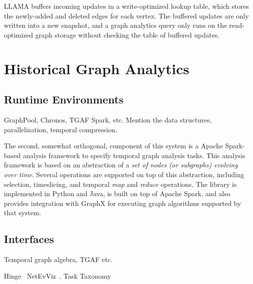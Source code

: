 \documentclass{svjour3}
\begin{document}
LLAMA buffers incoming updates in a write-optimized lookup table, which stores the newly-added and deleted edges for each vertex. The buffered updates are only written into a new snapshot, and a graph analytics query only runs on the read-optimized graph storage without checking the table of buffered updates.





\section{Historical Graph Analytics}

\subsection{Runtime Environments}
GraphPool, Chronos, TGAF Spark, etc. Mention the data structures, parallelization, temporal compression.

\vspace{2mm}
 The second, somewhat orthogonal, component of this system is a Apache Spark-based analysis
framework to specify temporal graph analysis tasks. This analysis framework is based on an abstraction of a \textit{set of nodes 
(or subgraphs) evolving over time}. Several operations are supported on top of this abstraction, including selection, timeslicing, and
temporal {\em map} and {\em reduce} operations. The library is implemented in Python and Java, is built on top of Apache Spark, and also provides
integration with GraphX for executing graph algorithms supported by that system.


\subsection{Interfaces}
Temporal graph algebra, TGAF etc.
~\cite{khurana2013efficient}~\cite{macko2015llama}~\cite{han2014chronos}~\cite{khurana2016storing}

Hinge~\cite{khurana2013hinge}
NetEvViz~\cite{khurana2011visual}.
Task Taxonomy~\cite{ahn2014task}





\end{document}
